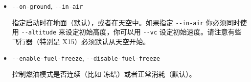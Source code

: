 \begin{itemize}
{\begin{itemize}
 当初始化 JSBSim 时是否启用调整片，默认会启用调整。

\item{\texttt{-$ $-on-ground}, \texttt{-$ $-in-air}}

 指定启动时在地面（默认），或者在天空中。如果指定 \texttt{-$ $-in-air} 你必须同时使用 \texttt{-$ $-altitude} 来设定初始高度，你可以用 \texttt{-$ $-vc} 设定初始速度。请注意有些飞行器（特别是 X15）必须默认从天空开始。

  \item{\texttt{-$ $-enable-fuel-freeze}, \texttt{-$ $-disable-fuel-freeze}}
 
 控制燃油模式是否连续（比如 冻结）或者正常消耗（默认）。
 
\end{itemize}
}
\fi










\end{itemize}
